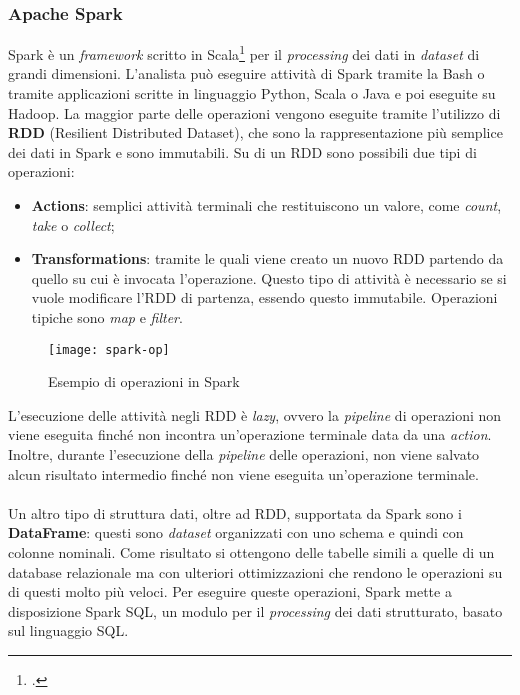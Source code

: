 \subsubsection{Apache Spark}
Spark è un \textit{framework} scritto in Scala\footcite{site:scala} per il \textit{processing} dei dati in \textit{dataset} di grandi dimensioni.
L'analista può eseguire attività di Spark tramite la \gls{Bash} o tramite applicazioni scritte in linguaggio Python, Scala o Java e poi eseguite su Hadoop.
La maggior parte delle operazioni vengono eseguite tramite l'utilizzo di \textbf{RDD} (Resilient Distributed Dataset), che sono la rappresentazione più semplice dei dati in Spark e sono immutabili. Su di un RDD sono possibili due tipi di operazioni:
\begin{itemize}
	\item \textbf{Actions}: semplici attività terminali che restituiscono un valore, come \textit{count}, \textit{take} o \textit{collect}; 
	\item \textbf{Transformations}: tramite le quali viene creato un nuovo RDD partendo da quello su cui è invocata l'operazione. Questo tipo di attività è necessario se si vuole modificare l'RDD di partenza, essendo questo immutabile. Operazioni tipiche sono \textit{map} e \textit{filter}.
\end{itemize}
\begin{figure}[!h]
	\centering
	\texttt{[image: spark-op]}
	\caption{Esempio di operazioni in Spark}
\end{figure}
L'esecuzione delle attività negli RDD è \textit{lazy}, ovvero la \textit{pipeline} di operazioni non viene eseguita finché non incontra un'operazione terminale data da una \textit{action}. Inoltre, durante l'esecuzione della \textit{pipeline} delle operazioni, non viene salvato alcun risultato intermedio finché non viene eseguita un'operazione terminale.\\\\
Un altro tipo di struttura dati, oltre ad RDD, supportata da Spark sono i \textbf{DataFrame}: questi sono \textit{dataset} organizzati con uno schema e quindi con colonne nominali. Come risultato si ottengono delle tabelle simili a quelle di un database relazionale ma con ulteriori ottimizzazioni che rendono le operazioni su di questi molto più veloci. Per eseguire queste operazioni, Spark mette a disposizione Spark SQL, un modulo per il \textit{processing} dei dati strutturato, basato sul linguaggio SQL.
\newpage
